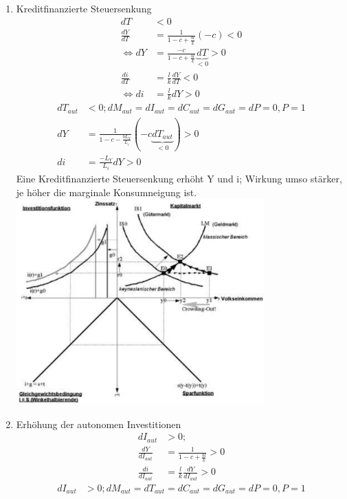 \documentclass{scrartcl}
\begin{document}
\begin{enumerate}
\begin{enumerate}
\item Kreditfinanzierte Steuersenkung
  \begin{align*}
    dT&<0\\
  \frac{dY}{dT} &= \frac{1}{1-c +\frac{b l}{k}} \left(- c \right) <0\\
  \Leftrightarrow dY &= \frac{-c}{1-c +\frac{b l}{k}} \underbrace{dT}_{<0} >0\\
  \frac{di}{dT} &= \frac{l}{k} \frac{dY}{dT} <0\\
  \Leftrightarrow di &= \frac{l}{k} dY > 0
  \end{align*}
  \begin{align*}
    dT_{aut}&<0; dM_{aut}=dI_{aut}=dC_{aut}=dG_{aut}=dP=0, P=1\\
  dY &= \frac{1}{1-c -\frac{b L_Y}{L_i}} \left(- c \underbrace{dT_{aut}}_{<0}\right) >0\\
  di &= \frac{-L_Y}{L_i} dY >0
  \end{align*}
  Eine Kreditfinanzierte Steuersenkung erh\"{o}ht Y und i; Wirkung umso st\"{a}rker, je h\"{o}her die marginale Konsumneigung ist.\\
\includegraphics[width=0.75\textwidth]{Bilder/Keynes_IS_LM_Kreditfinanzierte_Steuersenkung.pdf}\\
\item Erh\"{o}hung der autonomen Investitionen
  \begin{align*}
    dI_{aut}&>0;\\
  \frac{dY}{dI_{aut}} &= \frac{1}{1-c +\frac{b l}{k}} >0\\
  \frac{di}{dI_{aut}} &= \frac{l}{k} \frac{dY}{dI_{aut}} >0
  \end{align*}
  \begin{align*}
    dI_{aut}&>0; dM_{aut}=dT_{aut}=dC_{aut}=dG_{aut}=dP=0, P=1\\

\end{align*}
\end{enumerate}
\end{enumerate}
\end{document}
